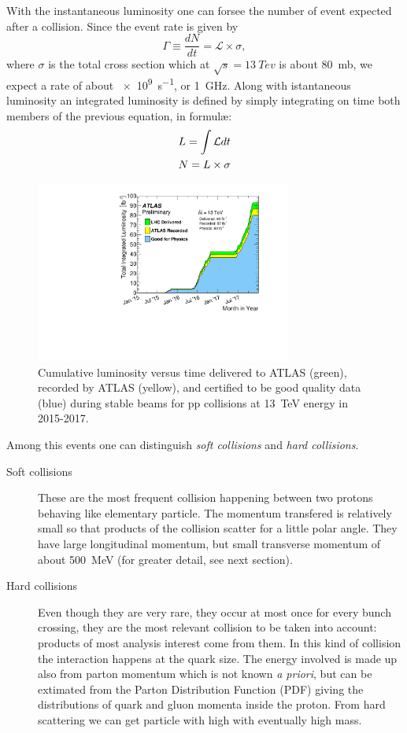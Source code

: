 With the instantaneous luminosity one can forsee the number of event expected after a collision. Since the event rate is given by 
\begin{equation}
\Gamma\equiv\frac{dN}{dt}=\mathcal{L}\times\sigma,
\end{equation}
where $\sigma$ is the total \pp cross section which at $\sqrt{s}=\SI{13}{Tev}$ is about \SI{80}{mb}, we expect a rate of about \SI{e9}{s^{-1}}, or \SI{1}{GHz}. Along with istantaneous luminosity an integrated luminosity is defined by simply integrating on time both members of the previous equation, in formul\ae:
\begin{gather}
	L=\int{\mathcal{L}dt} \notag\\
	N=L\times\sigma
\end{gather} 

\begin{figure}[tp]
	\centering
	\includegraphics[width=0.75\textwidth]{LHC_ATLAS/intlumivstimeRun2DQ.pdf}
	\caption{Cumulative luminosity versus time delivered to ATLAS (green), recorded by ATLAS (yellow), and certified to be good quality data (blue) during stable beams for pp collisions at \SI{13}{TeV} \cm energy in 2015-2017.}
\end{figure}

Among this events one can distinguish \emph{soft collisions} and \emph{hard collisions}.
\begin{description}
\item[Soft collisions] These are the most frequent collision happening between two protons behaving like elementary particle. The momentum transfered is relatively small so that products of the collision scatter for a little polar angle. They have large longitudinal \mbox{momentum}, but small transverse momentum \pt of about \SI{500}{MeV} (for greater detail, see next section).
\item[Hard collisions] Even though they are very rare, they occur at most once for every bunch crossing, they are the most relevant collision to be taken into account: products of most analysis interest come from them. In this kind of collision the interaction happens at the quark size. The energy involved is made up also from parton momentum which is not known \emph{a priori}, but can be extimated from the Parton Distribution Function (PDF) giving the distributions of quark and gluon momenta inside the proton. From hard scattering we can get particle with high \pt with eventually high mass.
\end{description}

